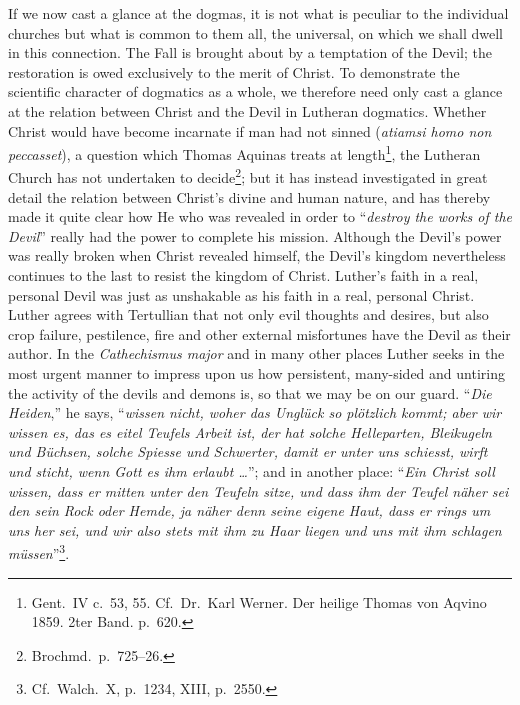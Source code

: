 \documentclass[12pt,a4paper]{article}
\newcommand{\opage}[1]{\marginnote{\footnotesize\textit{[#1]}}}
\begin{document}
If we now cast a glance at the dogmas, it is not what is peculiar to the
individual churches but what is common to them all, the universal, on which
we shall dwell in this connection. The Fall is brought about by a temptation
of the Devil; the restoration is owed exclusively to the merit of Christ. To
demonstrate the scientific character of dogmatics as a whole, we therefore
need only cast a glance at the relation between Christ and the Devil in
Lutheran dogmatics. Whether Christ would have become incarnate if man had
not sinned (\textit{atiamsi homo non peccasset}), a question which Thomas
Aquinas treats at length\footnote{Gent.\ IV c.\ 53, 55. Cf.\ Dr.\ Karl Werner. Der heilige Thomas von
Aqvino 1859. 2ter Band. p.\ 620.}, %
\opage{23}the Lutheran Church has not undertaken to decide\footnote{Brochmd.\ p.\ 725--26.}; %
but it has instead investigated in great detail the relation between
Christ's divine and human nature, and has thereby made it quite clear how
He who was revealed in order to ``\emph{destroy the works of the Devil}''
really had the power to complete his mission. Although the Devil's power
was really broken when Christ revealed himself, the Devil's kingdom
nevertheless continues to the last to resist the kingdom of Christ.
Luther's faith in a real, personal Devil was just as unshakable as his
faith in a real, personal Christ. Luther agrees with Tertullian that not
only evil thoughts and desires, but also crop failure, pestilence, fire and
other external misfortunes have the Devil as their author. In the
\textit{Cathechismus major} and in many other places Luther seeks in the
most urgent manner to impress upon us how persistent, many-sided and
untiring the activity of the devils and demons is, so that we may be on our
guard. ``\textit{Die Heiden},'' he says, ``\textit{wissen nicht, woher das
Unglück so plötzlich kommt; aber wir wissen es, das es eitel Teufels Arbeit
ist, der hat solche Helleparten, Bleikugeln und Büchsen, solche Spiesse und
Schwerter, damit er unter uns schiesst, wirft und sticht, wenn Gott es ihm
erlaubt \ldots}''; and in another place: ``\textit{Ein Christ soll wissen,
dass er mitten unter den Teufeln sitze, und dass ihm der Teufel näher sei
den sein Rock oder Hemde, ja näher denn seine eigene Haut, dass er rings um
uns her sei, und wir also stets mit ihm zu Haar liegen und uns mit ihm
schlagen müssen}''\footnote{Cf.\ Walch.\ X, p.\ 1234, XIII, p.\ 2550.}. %
\end{document}
